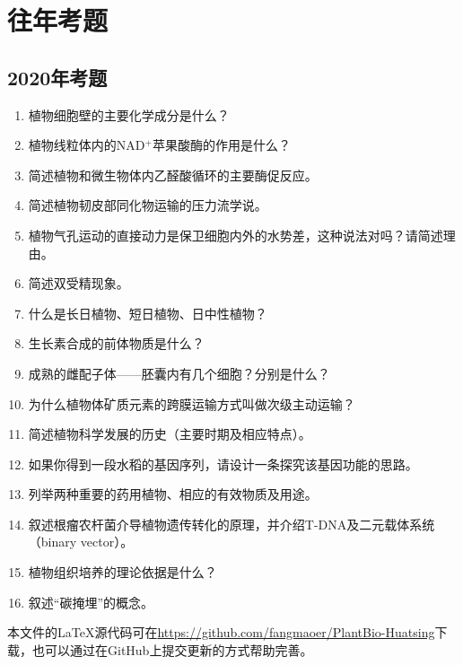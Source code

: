 \chapter{往年考题}

\section{2020年考题}

\begin{enumerate}
    \item 植物细胞壁的主要化学成分是什么？
    \item 植物线粒体内的NAD$^+$苹果酸酶的作用是什么？
    \item 简述植物和微生物体内乙醛酸循环的主要酶促反应。
    \item 简述植物韧皮部同化物运输的压力流学说。
    \item 植物气孔运动的直接动力是保卫细胞内外的水势差，这种说法对吗？请简述理由。
    \item 简述双受精现象。
    \item 什么是长日植物、短日植物、日中性植物？
    \item 生长素合成的前体物质是什么？
    \item 成熟的雌配子体——胚囊内有几个细胞？分别是什么？
    \item 为什么植物体矿质元素的跨膜运输方式叫做次级主动运输？
    \item 简述植物科学发展的历史（主要时期及相应特点）。
    \item 如果你得到一段水稻的基因序列，请设计一条探究该基因功能的思路。
    \item 列举两种重要的药用植物、相应的有效物质及用途。
    \item 叙述根瘤农杆菌介导植物遗传转化的原理，并介绍T-DNA及二元载体系统（binary vector）。
    \item 植物组织培养的理论依据是什么？
    \item 叙述“碳掩埋”的概念。
\end{enumerate}

本文件的\LaTeX{}源代码可在\url{https://github.com/fangmaoer/PlantBio-Huatsing}下载，也可以通过在GitHub上提交更新的方式帮助完善。